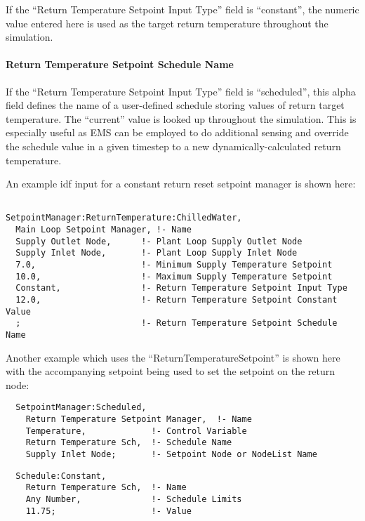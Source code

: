 If the ``Return Temperature Setpoint Input Type'' field is ``constant'', the numeric value entered here is used as the target return temperature throughout the simulation.

\paragraph{Return Temperature Setpoint Schedule Name}\label{return-temperature-setpoint-schedule-name}

If the ``Return Temperature Setpoint Input Type'' field is ``scheduled'', this alpha field defines the name of a user-defined schedule storing values of return target temperature. The ``current'' value is looked up throughout the simulation. This is especially useful as EMS can be employed to do additional sensing and override the schedule value in a given timestep to a new dynamically-calculated return temperature.

An example idf input for a constant return reset setpoint manager is shown here:

\begin{lstlisting}

SetpointManager:ReturnTemperature:ChilledWater,
  Main Loop Setpoint Manager, !- Name
  Supply Outlet Node,      !- Plant Loop Supply Outlet Node
  Supply Inlet Node,       !- Plant Loop Supply Inlet Node
  7.0,                     !- Minimum Supply Temperature Setpoint
  10.0,                    !- Maximum Supply Temperature Setpoint
  Constant,                !- Return Temperature Setpoint Input Type
  12.0,                    !- Return Temperature Setpoint Constant Value
  ;                        !- Return Temperature Setpoint Schedule Name
\end{lstlisting}

Another example which uses the ``ReturnTemperatureSetpoint'' is shown here with the accompanying setpoint being used to set the setpoint on the return node:

\begin{lstlisting}
  SetpointManager:Scheduled,
    Return Temperature Setpoint Manager,  !- Name
    Temperature,             !- Control Variable
    Return Temperature Sch,  !- Schedule Name
    Supply Inlet Node;       !- Setpoint Node or NodeList Name
\end{lstlisting}

\begin{lstlisting}
  Schedule:Constant,
    Return Temperature Sch,  !- Name
    Any Number,              !- Schedule Limits
    11.75;                   !- Value
\end{lstlisting}

